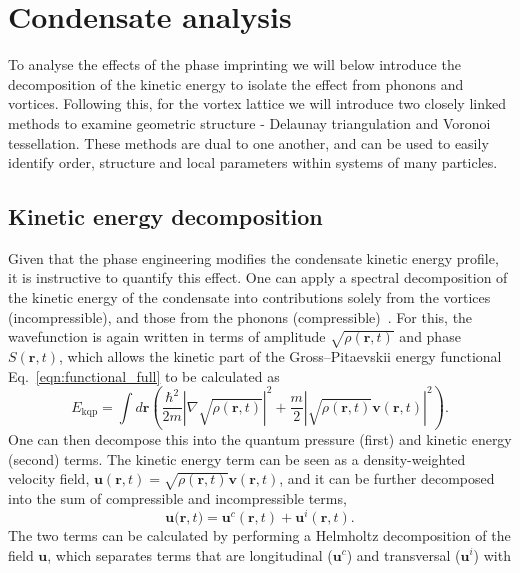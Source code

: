 \section{Condensate analysis}\label{sec:con_analysis}
To analyse the effects of the phase imprinting we will below introduce the decomposition of the kinetic energy to isolate the effect from phonons and vortices. Following this, for the vortex lattice we will introduce two closely linked methods to examine geometric structure - Delaunay triangulation and Voronoi tessellation. These methods are dual to one another, and can be used to easily identify order, structure and local parameters within systems of many particles.

\subsection{Kinetic energy decomposition}\label{sec:kinspec}
Given that the phase engineering modifies the condensate kinetic energy profile, it is instructive to quantify this effect. One can apply a spectral decomposition of the kinetic energy of the condensate into contributions solely from the vortices (incompressible), and those from the phonons (compressible)~\cite{CT:Nore_prl_1997,CT:Nore_pof_1997,CT:Bradley_prx_2012}. For this, the wavefunction is again written in terms of amplitude $\sqrt{\rho(\mathbf{r},t)}$ and phase $S(\mathbf{r},t)$, which allows the kinetic part of the Gross--Pitaevskii energy functional Eq.~\eqref{eqn:functional_full} to be calculated as
\begin{equation}
    E_{\text{kqp}} = \int d\mathbf{r} \left( \frac{\hbar^2}{2m}| \nabla\sqrt{\rho(\mathbf{r},t)} |^2  + \frac{m}{2}|\sqrt{\rho(\mathbf{r},t)}\mathbf{v}(\mathbf{r},t) |^2\right).
\end{equation}
One can then decompose this into the quantum pressure (first) and kinetic energy (second) terms. The kinetic energy term can be seen as a density-weighted velocity field, $\mathbf{u}(\mathbf{r},t) = \sqrt{\rho(\mathbf{r},t)}\mathbf{v}(\mathbf{r},t)$, and it can be further decomposed into the sum of compressible and incompressible terms,
\begin{equation}\label{eqn:kin_en}
    \mathbf{u(r},t) = \mathbf{u}^c(\mathbf{r},t) + \mathbf{u}^i(\mathbf{r},t).
\end{equation}
The two terms can be calculated by performing a Helmholtz decomposition of the field $\mathbf{u}$, which separates terms that are longitudinal ($\mathbf{u}^c$) and transversal ($\mathbf{u}^i$) with
